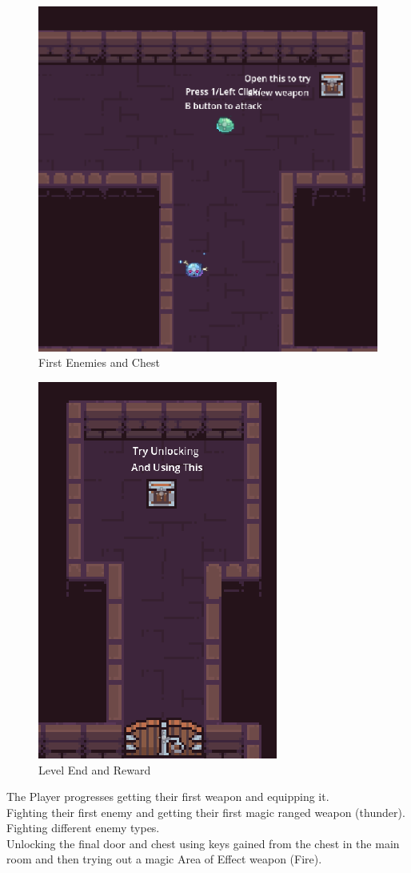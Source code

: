 \documentclass{article}
\begin{document}
\begin{multicols}{2}
\begin{figure}[H]
                        \includegraphics[width = 0.6\columnwidth]{images/development/Tutorial_2.PNG}
                        \caption{First Enemies and Chest}
                \end{figure}
                \begin{figure}[H]
                        \centering
                        \includegraphics[width = 0.6\columnwidth]{images/development/Tutorial_4.PNG}
                        \caption{Level End and Reward}
                \end{figure}
        \end{multicols}
        The Player progresses getting their first weapon and equipping it.\\
        Fighting their first enemy and getting their first magic ranged weapon (thunder).\\
        Fighting different enemy types.\\ 
        Unlocking the final door and chest using keys gained from the chest in the main room and then trying out a magic Area of Effect weapon (Fire).\\
\end{document}

